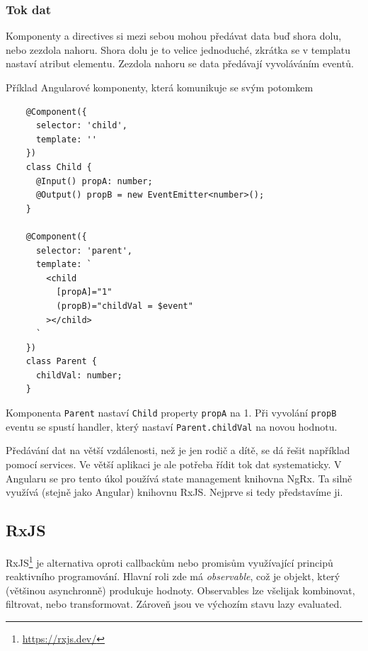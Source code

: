 \subsubsection*{Tok dat}

Komponenty a directives si mezi sebou mohou předávat data buď shora dolu, nebo zezdola nahoru. Shora dolu je to velice jednoduché, zkrátka se v templatu nastaví atribut elementu. Zezdola nahoru se data předávají vyvoláváním eventů.

\begin{exmp}
  Příklad Angularové komponenty, která komunikuje se svým potomkem

  \begin{lstlisting}
    @Component({
      selector: 'child',
      template: ''
    })
    class Child {
      @Input() propA: number;
      @Output() propB = new EventEmitter<number>();
    }

    @Component({
      selector: 'parent',
      template: `
        <child
          [propA]="1"
          (propB)="childVal = $event"
        ></child>
      `
    })
    class Parent {
      childVal: number;
    }
  \end{lstlisting}

  Komponenta \/\lstinline|Parent| nastaví \/\lstinline|Child| property \/\lstinline|propA| na 1. Při vyvolání \/\lstinline|propB| eventu se spustí handler, který nastaví \/\lstinline|Parent.childVal| na novou hodnotu.
\end{exmp}

Předávání dat na větší vzdálenosti, než je jen rodič a dítě, se dá řešit například pomocí services. Ve větší aplikaci je ale potřeba řídit tok dat systematicky. V Angularu se pro tento úkol používá state management knihovna NgRx. Ta silně využívá (stejně jako Angular) knihovnu RxJS. Nejprve si tedy představíme ji.

\subsection{RxJS}

RxJS\footnote{\url{https://rxjs.dev/}} je alternativa oproti callbackům nebo promisům využívající principů reaktivního programování. Hlavní roli zde má \emph{observable}, což je objekt, který (většinou asynchronně) produkuje hodnoty. Observables lze všelijak kombinovat, filtrovat, nebo transformovat. Zároveň jsou ve výchozím stavu lazy evaluated.

